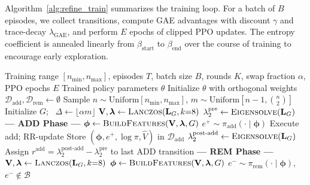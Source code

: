 \documentclass{article}
\begin{document}
Algorithm~\ref{alg:refine_train} summarizes the training loop. For a batch of $B$ episodes, we collect transitions, compute GAE advantages with discount $\gamma$ and trace-decay $\lambda_{\text{GAE}}$, and perform $E$ epochs of clipped PPO updates. The entropy coefficient is annealed linearly from $\beta_{\text{start}}$ to $\beta_{\text{end}}$ over the course of training to encourage early exploration.

\begin{algorithm}[t]
\caption{REFINE Training}\label{alg:refine_train}
\begin{algorithmic}[1]
\Require Training range $[n_{\min}, n_{\max}]$, episodes $T$, batch size $B$, rounds $K$, swap fraction $\alpha$, PPO epochs $E$
\Ensure Trained policy parameters $\theta$
\State Initialize $\theta$ with orthogonal weights
    \State $\mathcal{D}_{\text{add}}, \mathcal{D}_{\text{rem}} \gets \emptyset$
     
        \State Sample $n \sim \text{Uniform}[n_{\min}, n_{\max}]$, $m \sim \text{Uniform}[n{-}1, \binom{n}{2}]$
        \State Initialize $G$; \, $\Delta \gets \lfloor \alpha m \rfloor$
            \State $\mathbf{V}, \boldsymbol{\lambda} \gets \textsc{Lanczos}(\mathbf{L}_G, k{=}8)$
            \State $\lambda_2^{\text{pre}} \gets \textsc{Eigensolve}(\mathbf{L}_G)$ 
            \Statex \hspace{2\algorithmicindent}\textbf{--- ADD Phase ---}
                \State $\boldsymbol{\phi} \gets \textsc{BuildFeatures}(\mathbf{V}, \boldsymbol{\lambda}, G)$ 
                \State $e^+ \sim \pi_{\text{add}}(\cdot \mid \boldsymbol{\phi})$ 
                \State Execute add; RR-update
                \State Store $(\boldsymbol{\phi}, e^+, \log\pi, \hat{V})$ in $\mathcal{D}_{\text{add}}$
            \EndFor
            \State $\lambda_2^{\text{post-add}} \gets \textsc{Eigensolve}(\mathbf{L}_G)$
            \State Assign $r^{\text{add}} = \lambda_2^{\text{post-add}} - \lambda_2^{\text{pre}}$ to last ADD transition
            \Statex \hspace{2\algorithmicindent}\textbf{--- REM Phase ---}
            \State $\mathbf{V}, \boldsymbol{\lambda} \gets \textsc{Lanczos}(\mathbf{L}_G, k{=}8)$ 
                \State $\boldsymbol{\phi} \gets \textsc{BuildFeatures}(\mathbf{V}, \boldsymbol{\lambda}, G)$
                \State $e^- \sim \pi_{\text{rem}}(\cdot \mid \boldsymbol{\phi})$, $e^- \notin \mathcal{B}$

\end{algorithmic}
\end{algorithm}
\end{document}
